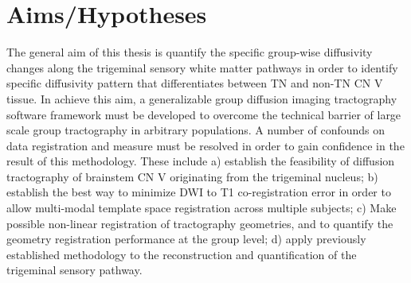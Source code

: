 \chapter{Aims/Hypotheses}

The general aim of this thesis is quantify the specific group-wise diffusivity changes along the trigeminal sensory white matter pathways in order to identify specific diffusivity pattern that differentiates between TN and non-TN CN V tissue. In achieve this aim, a generalizable group diffusion imaging tractography software framework must be developed to overcome the technical barrier of large scale group tractography in arbitrary populations. A number of confounds on data registration and measure must be resolved in order to gain confidence in the result of this methodology. These include a) establish the feasibility of diffusion tractography of brainstem CN V originating from the trigeminal nucleus; b) establish the best way to minimize DWI to T1 co-registration error in order to allow multi-modal template space registration across multiple subjects; c) Make possible non-linear registration of tractography geometries, and to quantify the geometry registration performance at the group level; d) apply previously established methodology to the reconstruction and quantification of the trigeminal sensory pathway. 


